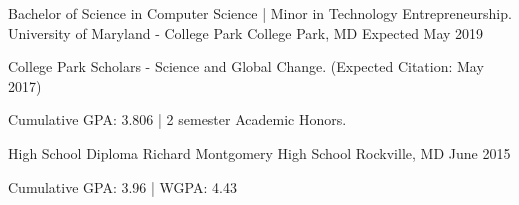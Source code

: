 

\begin{cventries}

  \cventry
    {Bachelor of Science in Computer Science  |  Minor in Technology Entrepreneurship.} %
    {University of Maryland - College Park} %
    {College Park, MD} %
    {Expected May 2019} %
    {
      \begin{cvitems} %
          \item {College Park Scholars - Science and Global Change. (Expected Citation: May 2017)}
          \item {Cumulative GPA: 3.806 | 2 semester Academic Honors.}
      \end{cvitems}
    }
    
    \cventry
    {High School Diploma} %
    {Richard Montgomery High School} %
    {Rockville, MD} %
    {June 2015} %
    {
      \begin{cvitems} %
         \item {Cumulative GPA: 3.96 | WGPA: 4.43}
      \end{cvitems}
    }

\end{cventries}
